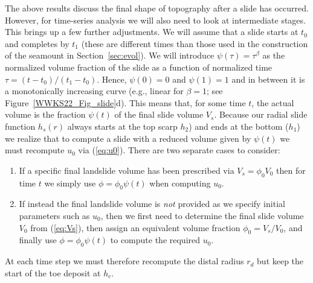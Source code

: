 The above results discuss the final shape of topography after a slide has occurred.  However, for time-series analysis
we will also need to look at intermediate stages.  This brings up a few further adjustments. We will assume that a
slide starts at $t_0$ and completes by $t_1$ (these are different times than those used in the construction of the seamount in Section~\ref{sec:evol}).
We will introduce $\psi(\tau) = \tau^\beta$ as the normalized volume
fraction of the slide as a function of normalized time $\tau = (t - t_0)/(t_1 - t_0)$.  Hence, $\psi(0) = 0$ and
$\psi(1) = 1$ and in between it is a monotonically increasing curve (e.g., linear for $\beta = 1$; see
Figure~\ref{WWKS22_Fig_slide}d).  This means that, for some time $t$, the actual volume is the fraction $\psi(t)$ of
the final slide volume $V_s$. Because our radial slide function $h_s(r)$ always starts at the top scarp $h_2$) and
ends at the bottom ($h_1$) we realize that to compute a slide with a reduced volume given by $\psi(t)$ we must
recompute $u_0$ via (\ref{eq:u0}). There are two separate cases to consider:
\begin{enumerate}
  \item If a specific final landslide volume has been prescribed via $V_s = \phi_0 V_0$ then for time $t$ we simply use
  $\phi = \phi_0 \psi(t)$ when computing $u_0$.
  \item If instead the final landslide volume is \emph{not} provided as we specify initial parameters such as $u_0$,
  then we first need to determine the final slide volume $V_0$ from (\ref{eq:Vs}), then assign an
  equivalent volume fraction  $\phi_0 = V_s/V_0$, and finally use $\phi = \phi_0 \psi(t)$ to compute the required
  $u_0$.
\end{enumerate}
At each time step we must therefore recompute the distal radius $r_d$ but keep the start of the toe deposit at $h_c$.


